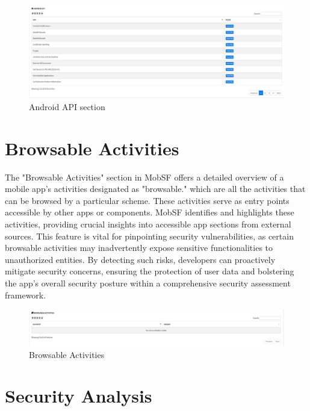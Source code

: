 \documentclass{report}
\begin{document}
\begin{figure}[hbt!]
        \centering
        \includegraphics[width=1\textwidth]{images/androidapi.jpg}
        \caption{Android API section}
        \label{fig:example}
\end{figure}

\FloatBarrier

\section{Browsable Activities}
The "Browsable Activities" section in MobSF offers a detailed overview of a mobile app's activities designated as "browsable." which are all the activities that can be browsed by a particular scheme. These activities serve as entry points accessible by other apps or components. MobSF identifies and highlights these activities, providing crucial insights into accessible app sections from external sources. This feature is vital for pinpointing security vulnerabilities, as certain browsable activities may inadvertently expose sensitive functionalities to unauthorized entities. By detecting such risks, developers can proactively mitigate security concerns, ensuring the protection of user data and bolstering the app's overall security posture within a comprehensive security assessment framework.

\begin{figure}[hbt!]
        \centering
        \includegraphics[width=1\textwidth]{images/browsable.jpg}
        \caption{Browsable Activities}
        \label{fig:example}
\end{figure}
\FloatBarrier

\section{Security Analysis}
\end{document}
